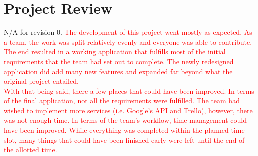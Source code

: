 \documentclass[12pt, titlepage]{article}
\begin{document}
\section{Project Review}
\sout{N/A for revision 0.} 
\textcolor{red}{The development of this project went mostly as expected. As a team, the work was split relatively evenly and everyone was able to contribute. The end resulted in a working application that fulfills most of the initial requirements that the team had set out to complete. The newly redesigned application did add many new features and expanded far beyond what the original project entailed.}\\

\textcolor{red}{With that being said, there a few places that could have been improved. In terms of the final application, not all the requirements were fulfilled. The team had wished to implement more services (i.e. Google's API and Trello), however, there was not enough time. In terms of the team's workflow, time management could have been improved. While everything was completed within the planned time slot, many things that could have been finished early were left until the end of the allotted time.}
\end{document}
